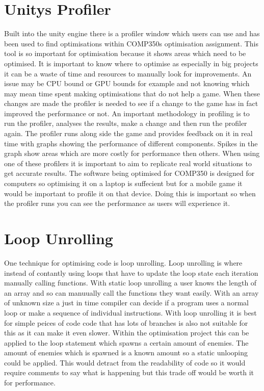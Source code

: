 \documentclass[journal]{IEEEtran}
\begin{document}
\section{Unitys Profiler}
Built into the unity engine there is a profiler window which users can use and has been used to find optimisations within COMP350s optimisation assignment.
This tool is so important for optimisation because it shows areas which need to be optimised.
It is important to know where to optimise as especially in big projects it can be a waste of time and resources to manually look for improvements.%
An issue may be CPU bound or GPU bounds for example and not knowing which may mean time spent making optimisations that do not help a game.
When these changes are made the profiler is needed to see if a change to the game has in fact improved the performance or not.%
An important methodology in profiling is to run the profiler, analyses the results, make a change and then run the profiler again.%
The profiler runs along side the game and provides feedback on it in real time with graphs showing the performance of different components.%
Spikes in the graph show areas which are more costly for performance then others.
When using one of these profilers it is important to aim to replicate real world situations to get accurate results. 
The software being optimised for COMP350 is designed for computers so optimising it on a laptop is suffecient but for a mobile game it would be important to profile it on that device.
Doing this is important so when the profiler runs you can see the performance as users will experience it. %


\section{Loop Unrolling}
One technique for optimising code is loop unrolling. Loop unrolling is where instead of contantly using loops that have to update the loop state each iteration manually calling functions. With static loop unrolling a user knows the length of an array and so can manuually call the functions they want easily. With an array of unknown size a just in time compiler can decide if a program uses a normal loop or make a sequence of individual instructions. With loop unrolling it is best for simple peices of code code that has lots of branches is also not suitable for this as it can make it even slower.%
Within the optimisation project this can be applied to the loop statement which spawns a certain amount of enemies. The amount of enemies which is spawned is a known amount so a static unlooping could be applied.
This would detract from the readability of code so it would require comments to say what is happening but this trade off would be worth it for performance.%
\end{document}
